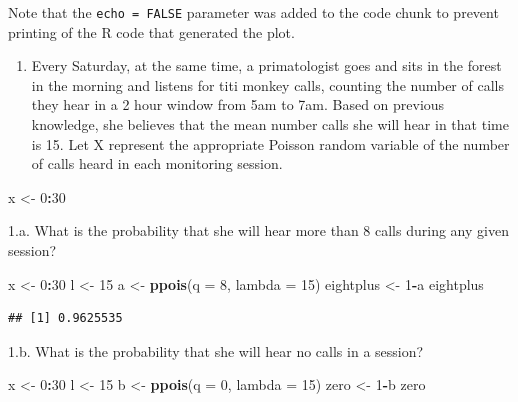 \documentclass[]{article}
\newenvironment{Shaded}{\begin{snugshade}}{\end{snugshade}}
\newcommand{\KeywordTok}[1]{\textcolor[rgb]{0.13,0.29,0.53}{\textbf{#1}}}
\newcommand{\DataTypeTok}[1]{\textcolor[rgb]{0.13,0.29,0.53}{#1}}
\newcommand{\DecValTok}[1]{\textcolor[rgb]{0.00,0.00,0.81}{#1}}
\newcommand{\StringTok}[1]{\textcolor[rgb]{0.31,0.60,0.02}{#1}}
\newcommand{\OperatorTok}[1]{\textcolor[rgb]{0.81,0.36,0.00}{\textbf{#1}}}
\newcommand{\NormalTok}[1]{#1}
\providecommand{\tightlist}{%
  \setlength{\itemsep}{0pt}\setlength{\parskip}{0pt}}
\begin{document}
Note that the \texttt{echo\ =\ FALSE} parameter was added to the code
chunk to prevent printing of the R code that generated the plot.

\begin{enumerate}
\def\labelenumi{\arabic{enumi}.}
\tightlist
\item
  Every Saturday, at the same time, a primatologist goes and sits in the
  forest in the morning and listens for titi monkey calls, counting the
  number of calls they hear in a 2 hour window from 5am to 7am. Based on
  previous knowledge, she believes that the mean number calls she will
  hear in that time is 15. Let X represent the appropriate Poisson
  random variable of the number of calls heard in each monitoring
  session.
\end{enumerate}

\begin{Shaded}
\begin{Highlighting}[]
\NormalTok{x <-}\StringTok{ }\DecValTok{0}\OperatorTok{:}\DecValTok{30}
\end{Highlighting}
\end{Shaded}

1.a. What is the probability that she will hear more than 8 calls during
any given session?

\begin{Shaded}
\begin{Highlighting}[]
\NormalTok{x <-}\StringTok{ }\DecValTok{0}\OperatorTok{:}\DecValTok{30}
\NormalTok{l <-}\StringTok{ }\DecValTok{15}
\NormalTok{a <-}\StringTok{ }\KeywordTok{ppois}\NormalTok{(}\DataTypeTok{q =} \DecValTok{8}\NormalTok{, }\DataTypeTok{lambda =} \DecValTok{15}\NormalTok{)}
\NormalTok{eightplus <-}\StringTok{ }\DecValTok{1}\OperatorTok{-}\NormalTok{a}
\NormalTok{eightplus}
\end{Highlighting}
\end{Shaded}

\begin{verbatim}
## [1] 0.9625535
\end{verbatim}

1.b. What is the probability that she will hear no calls in a session?

\begin{Shaded}
\begin{Highlighting}[]
\NormalTok{x <-}\StringTok{ }\DecValTok{0}\OperatorTok{:}\DecValTok{30}
\NormalTok{l <-}\StringTok{ }\DecValTok{15}
\NormalTok{b <-}\StringTok{ }\KeywordTok{ppois}\NormalTok{(}\DataTypeTok{q =} \DecValTok{0}\NormalTok{, }\DataTypeTok{lambda =} \DecValTok{15}\NormalTok{)}
\NormalTok{zero <-}\StringTok{ }\DecValTok{1}\OperatorTok{-}\NormalTok{b}
\NormalTok{zero}
\end{Highlighting}
\end{Shaded}
\end{document}

